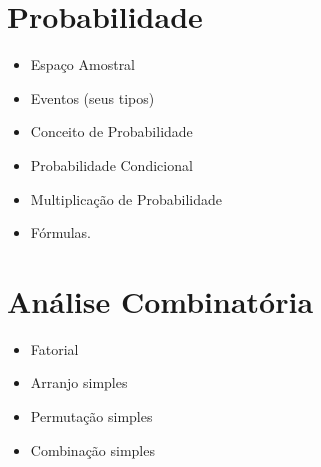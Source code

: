 \documentclass[11pt,fleqn]{book}
\begin{document}
\section{Probabilidade}%

	\begin{itemize}
		\item Espaço Amostral
		\item Eventos (seus tipos)
		\item Conceito de Probabilidade
		\item Probabilidade Condicional
		\item Multiplicação de Probabilidade
		\item Fórmulas.
	\end{itemize}

\section{Análise Combinatória}%

	\begin{itemize}
		\item Fatorial
		\item Arranjo simples
		\item Permutação simples
		\item Combinação simples
	\end{itemize}
\end{document}

